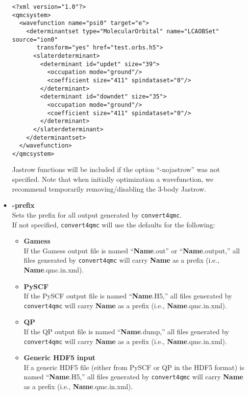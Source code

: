 \begin{itemize}
\begin{lstlisting}[style=QMCPXML]
 <?xml version="1.0"?>
<qmcsystem>
  <wavefunction name="psi0" target="e">
    <determinantset type="MolecularOrbital" name="LCAOBSet" source="ion0"
       transform="yes" href="test.orbs.h5">
      <slaterdeterminant>
        <determinant id="updet" size="39">
          <occupation mode="ground"/>
          <coefficient size="411" spindataset="0"/>
        </determinant>
        <determinant id="downdet" size="35">
          <occupation mode="ground"/>
          <coefficient size="411" spindataset="0"/>
        </determinant>
      </slaterdeterminant>
    </determinantset>
  </wavefunction>
</qmcsystem>
\end{lstlisting}

Jastrow functions will be included if the option ``-nojastrow'' was
not specified. Note that when initially optimization a wavefunction, we recommend
temporarily removing/disabling the 3-body Jastrow.

\item \textbf{-prefix}\\
Sets the prefix for all output generated by \texttt{convert4qmc}. \\
If not specified, \texttt{convert4qmc} will use the defaults for the following:\\
\begin{itemize}
 \item \textbf{Gamess}\\
If the Gamess output file  is named ``\textbf{Name}.out'' or ``\textbf{Name}.output,'' all files generated by \texttt{convert4qmc} will carry \textbf{Name} as a prefix (i.e., \textbf{Name}.qmc.in.xml).\\ 
\item \textbf{PySCF}\\
If the PySCF output file  is named ``\textbf{Name}.H5,'' all files generated by \texttt{convert4qmc} will carry \textbf{Name} as a prefix (i.e., \textbf{Name}.qmc.in.xml).\\ 
\item \textbf{QP}\\
If the QP output file  is named ``\textbf{Name}.dump,'' all files generated by \texttt{convert4qmc} will carry \textbf{Name} as a prefix (i.e., \textbf{Name}.qmc.in.xml).\\ 
\item \textbf{Generic HDF5 input}\\
If a generic HDF5 file (either from PySCF or QP in the HDF5 format) is named ``\textbf{Name}.H5,'' all files generated by \texttt{convert4qmc} will carry \textbf{Name} as a prefix (i.e., \textbf{Name}.qmc.in.xml).\\ 


\end{itemize}
\end{itemize}
